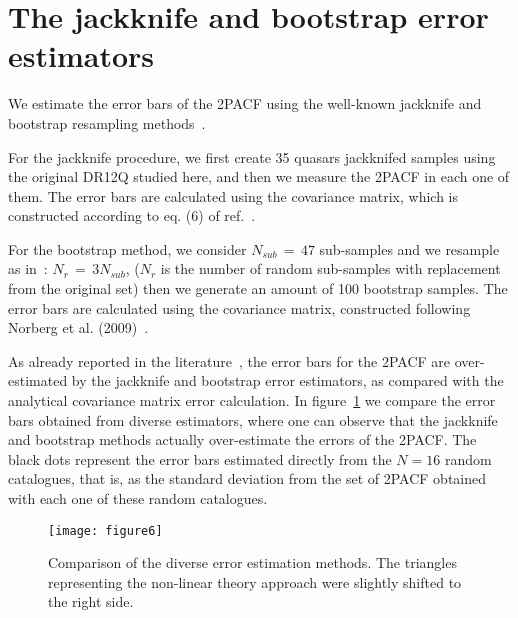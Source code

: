 \documentclass[a4paper,11pt]{article}
\begin{document}
\appendix
\section{The jackknife and bootstrap error estimators}

\noindent
We estimate the error bars of the 2PACF using the well-known jackknife and bootstrap resampling 
methods~\cite{Myers,Ross,Shanks,Norberg}. 

For the jackknife procedure, we first create 35 quasars jackknifed samples using the original 
DR12Q studied here, and then we measure the 2PACF in each one of them. 
The error bars are calculated using the covariance matrix, which is constructed according to eq. (6) 
of ref.~\cite{Crocce11b}. 

For the bootstrap method, we consider $N_{sub} \,=\, 47$ sub-samples and we resample as in~\cite{Norberg}: 
$N_{r} \,=\, 3 N_{sub}$, ($N_{r}$ is the number of random sub-samples with replacement from the original set) then we generate an amount of 100 bootstrap samples. 
The error bars are calculated using the covariance matrix, constructed following 
Norberg et al. (2009)~\cite{Norberg}. 
 
As already reported in the literature~\cite{Crocce11a,Crocce11b,Norberg}, the error bars for the 
2PACF are over-estimated by the jackknife and bootstrap error estimators, as compared with the 
analytical covariance matrix error calculation. 
In figure~\ref{fig6} we compare the error bars obtained from diverse estimators, where one 
can observe that the jackknife and bootstrap methods actually over-estimate the errors of the 
2PACF. 
The black dots represent the error bars estimated directly from the $N=16$ random catalogues, 
that is, as the standard deviation from the set of 2PACF obtained with each one of these random 
catalogues. 


\begin{figure}[h]
\centering
\texttt{[image: figure6]}
\caption{
Comparison of the diverse error estimation methods. 
The triangles representing the non-linear theory approach were slightly shifted to the right side.
} 
\label{fig6}
\end{figure}
\end{document}
